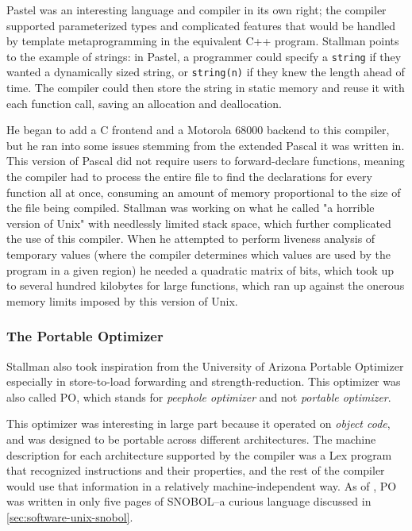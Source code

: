 Pastel was an interesting language and compiler in its own right;
the compiler supported parameterized types and complicated features
that would be handled by template metaprogramming in the equivalent C++ program.
Stallman points to the example of strings: in Pastel, a programmer
could specify a \texttt{string} if they wanted a dynamically sized string,
or \texttt{string(n)} if they knew the length ahead of time.
The compiler could then store the string in static memory and reuse it
with each function call, saving an allocation and deallocation.

He began to add a C frontend and a Motorola 68000 backend to this compiler,
but he ran into some issues stemming from the extended Pascal it was
written in.
This version of Pascal did not require users to forward-declare functions,
meaning the compiler had to process the entire file to find the declarations
for every function all at once, consuming an amount of memory proportional
to the size of the file being compiled.
Stallman was working on what he called "a horrible version of Unix"
\parencite{stallman_kth_transcript_1986} with
needlessly limited stack space, which further complicated the use of this compiler.
When he attempted to perform liveness analysis of temporary values
(where the compiler determines which values are used by the program in a given region)
he needed a quadratic matrix of bits, which took up to several hundred kilobytes
for large functions, which ran up against the onerous memory limits imposed
by this version of Unix.

\subsubsection{The Portable Optimizer}
\label{sec:software-gnu-portable-optimizer}

Stallman also took inspiration from the University of Arizona
Portable Optimizer
especially in store-to-load \gls{forward}ing and \gls{strength-reduction}.
This optimizer was also called PO, which stands for \textit{peephole optimizer}
and not \textit{portable optimizer}.

This optimizer was interesting in large part because it operated on \textit{object code},
and was designed to be portable across different architectures.
The machine description for each architecture supported by the compiler was
a Lex program that recognized instructions and their properties,
and the rest of the compiler would use that information in a relatively
machine-independent way.
As of \citeyear{davidson_fraser_retargetable_peephole_optimizer_po_1980},
PO was written in only five pages of SNOBOL--a curious language discussed in
\cref{sec:software-unix-snobol}.

